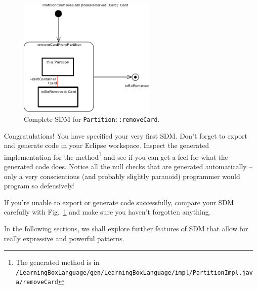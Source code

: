 \begin{figure}[htbp]
\begin{center}
  \includegraphics[width=0.6\textwidth]{pics/sdmBilder/removeCard/sdm15}
  \caption{Complete SDM for \texttt{Partition::removeCard}.}  
  \label{fig:sdm_complete_control_flow}
\end{center}
\end{figure}

Congratulations!  You have specified your very first SDM.  
Don't forget to export and generate code in your Eclipse workspace. 
Inspect the generated implementation for the method\footnote{The generated method is in \texttt{/Learning\-Box\-Language/\-gen/\-Learning\-Box\-Language/\-impl/\-Partition\-Impl.java/\-remove\-Card}} and see if you can get a feel for what the generated code does. 
Notice all the null checks that are generated automatically -- only a very conscientious (and probably slightly paranoid) programmer would program so defensively!

If you're unable to export or generate code successfully, compare your SDM carefully with Fig.~\ref{fig:sdm_complete_control_flow} and make sure you haven't forgotten anything.

In the following sections, we shall explore further features of SDM that allow for really expressive and powerful patterns.
